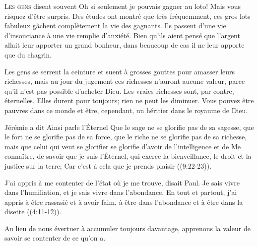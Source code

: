 
\lettrine{L}{es gens} disent souvent\frcolon{} 
 \Og Oh si seulement je pouvais gagner au loto! \Fg{}
 Mais vous risquez d'être surpris. Des études ont montré
 que très fréquemment, ces gros lots fabuleux gâchent complètement
 la vie des gagnants. Ils passent d'une vie d'insouciance
 à une vie remplie d'anxiété. Bien qu'ils aient pensé
 que l'argent allait leur apporter un grand bonheur,
 dans beaucoup de cas il ne leur apporte que du chagrin.

Les gens se serrent la ceinture et suent à grosses gouttes
 pour amasser leurs richesses, mais au jour du jugement
 ces richesses n'auront aucune valeur, parce qu'il n'est pas possible
 d'acheter Dieu. Les vraies richesses sont, par contre, éternelles.
 Elles durent pour toujours; rien ne peut les diminuer.
 Vous pouvez être pauvres dans ce monde et être, cependant,
 un héritier dans le royaume de Dieu.


Jérémie a dit\frcolon{} 
 \Og Ainsi parle l'Éternel\frcolon{} Que le sage ne se glorifie pas de sa sagesse,
 que le fort ne se glorifie pas de sa force, que le riche ne se glorifie pas
 de sa richesse, mais que celui qui veut se glorifier se glorifie d'avoir
 de l'intelligence et de Me connaître, de savoir que je suis l'Éternel,
 qui exerce la bienveillance, le droit et la justice sur la terre;
 Car c'est à cela que je prends plaisir \Fg{} 
 ((9:22-23)).

\Og J'ai appris à me contenter de l'état où je me trouve, disait Paul.
 Je sais vivre dans l'humiliation, et je sais vivre dans l'abondance.
 En tout et partout, j'ai appris à être rassasié et à avoir faim,
 à être dans l'abondance et à être dans la disette \Fg{} 
 ((4:11-12)).

Au lieu de nous évertuer à accumuler toujours davantage, apprenons la valeur
 de savoir se contenter de ce qu'on a. 

\dvrule



